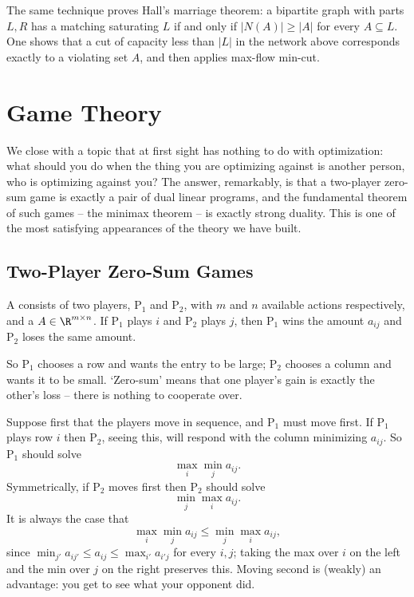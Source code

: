 \begin{remark}
    The same technique proves Hall's marriage theorem: a bipartite graph with parts $L, R$ has a matching saturating $L$ if and only if $|N(A)| \geq |A|$ for every $A \subseteq L$. One shows that a cut of capacity less than $|L|$ in the network above corresponds exactly to a violating set $A$, and then applies max-flow min-cut.
\end{remark}

\section{Game Theory}

We close with a topic that at first sight has nothing to do with optimization: what should you do when the thing you are optimizing against is another person, who is optimizing against you? The answer, remarkably, is that a two-player zero-sum game is exactly a pair of dual linear programs, and the fundamental theorem of such games -- the minimax theorem -- is exactly strong duality. This is one of the most satisfying appearances of the theory we have built.

\subsection{Two-Player Zero-Sum Games}

\begin{definition}
    A  consists of two players, $\mathrm{P}_1$ and $\mathrm{P}_2$, with $m$ and $n$ available actions respectively, and a  $A \in \R^{m\times n}$. If $\mathrm{P}_1$ plays $i$ and $\mathrm{P}_2$ plays $j$, then $\mathrm{P}_1$ wins the amount $a_{ij}$ and $\mathrm{P}_2$ loses the same amount.
\end{definition}

So $\mathrm{P}_1$ chooses a row and wants the entry to be large; $\mathrm{P}_2$ chooses a column and wants it to be small. `Zero-sum' means that one player's gain is exactly the other's loss -- there is nothing to cooperate over.

Suppose first that the players move in sequence, and $\mathrm{P}_1$ must move first. If $\mathrm{P}_1$ plays row $i$ then $\mathrm{P}_2$, seeing this, will respond with the column minimizing $a_{ij}$. So $\mathrm{P}_1$ should solve
$$
\max_{i}\min_j a_{ij}.
$$
Symmetrically, if $\mathrm{P}_2$ moves first then $\mathrm{P}_2$ should solve
$$
\min_j\max_i a_{ij}.
$$
It is always the case that
$$
\max_i\min_j a_{ij} \leq \min_j\max_i a_{ij},
$$
since $\min_{j'}a_{ij'} \leq a_{ij} \leq \max_{i'}a_{i'j}$ for every $i, j$; taking the max over $i$ on the left and the min over $j$ on the right preserves this. Moving second is (weakly) an advantage: you get to see what your opponent did.

